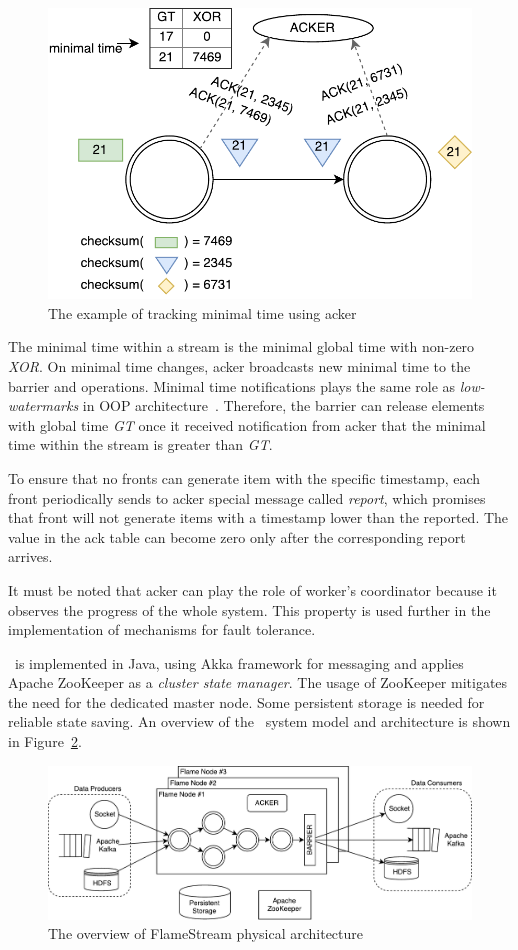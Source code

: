 \begin{figure}[htbp]
  \centering
  \includegraphics[scale=0.58]{pics/acker}
  \caption{The example of tracking minimal time using acker}
  \label {acker}
\end{figure}

The minimal time within a stream is the minimal global time with non-zero {\it XOR}. On minimal time changes, acker broadcasts new minimal time to the barrier and operations. Minimal time notifications plays the same role as {\em low-watermarks} in OOP architecture~\cite{Li:2008:OPN:1453856.1453890}. Therefore, the barrier can release elements with global time {\it GT} once it received notification from acker that the minimal time within the stream is greater than {\it GT}.

To ensure that no fronts can generate item with the specific timestamp, each front periodically sends to acker special message called {\it report}, which promises that front will not generate items with a timestamp lower than the reported. The value in the ack table can become zero only after the corresponding report arrives.

It must be noted that acker can play the role of worker's coordinator because it observes the progress of the whole system. This property is used further in the implementation of mechanisms for fault tolerance. 

\FlameStream\ is implemented in Java, using Akka framework for messaging and applies Apache ZooKeeper as a {\it cluster state manager}. The usage of ZooKeeper mitigates the need for the dedicated master node. Some persistent storage is needed for reliable state saving. An overview of the \FlameStream\ system model and architecture is shown in Figure~\ref{arch}.

\begin{figure}[htbp]
  \centering
  \includegraphics[scale=0.58]{pics/arch}
  \caption{The overview of FlameStream physical architecture}
  \label {arch}
\end{figure}
